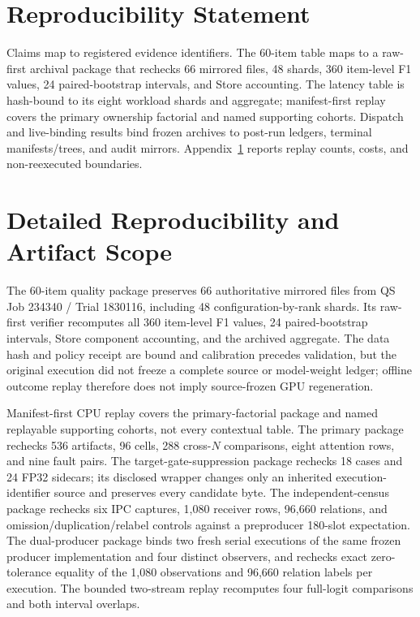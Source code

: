 \documentclass{article}
\begin{document}
\section*{Reproducibility Statement}
Claims map to registered evidence identifiers.  The 60-item table maps to a
raw-first archival package that rechecks 66 mirrored files, 48 shards, 360
item-level F1 values, 24 paired-bootstrap intervals, and Store accounting.  The
latency table is hash-bound to its eight workload shards and aggregate;
manifest-first replay covers the primary ownership factorial and named
supporting cohorts.  Dispatch and live-binding results bind frozen archives to
post-run ledgers, terminal manifests/trees, and audit mirrors.
Appendix~\ref{app:reproducibility} reports replay counts, costs, and
non-reexecuted boundaries.




\appendix

\section{Detailed Reproducibility and Artifact Scope}
\label{app:reproducibility}

The 60-item quality package preserves 66 authoritative mirrored files from QS
Job 234340 / Trial 1830116, including 48 configuration-by-rank shards.  Its
raw-first verifier recomputes all 360 item-level F1 values, 24 paired-bootstrap
intervals, Store component accounting, and the archived aggregate.  The data
hash and policy receipt are bound and calibration precedes validation, but the
original execution did not freeze a complete source or model-weight ledger;
offline outcome replay therefore does not imply source-frozen GPU regeneration.

Manifest-first CPU replay covers the primary-factorial package and named
replayable supporting cohorts, not every contextual table.  The primary package
rechecks 536 artifacts, 96 cells, 288 cross-$N$ comparisons, eight attention
rows, and nine fault pairs.  The target-gate-suppression package rechecks 18
cases and 24 FP32 sidecars; its disclosed wrapper changes only an inherited
execution-identifier source and preserves every candidate byte.  The
independent-census package rechecks six IPC captures, 1,080 receiver rows,
96,660 relations, and omission/duplication/relabel controls against a
preproducer 180-slot expectation.  The dual-producer package binds two fresh
serial executions of the same frozen producer implementation and four distinct
observers, and rechecks exact zero-tolerance equality of the 1,080 observations
and 96,660 relation labels per execution.  The
bounded two-stream replay recomputes four full-logit comparisons and both
interval overlaps.
\end{document}
